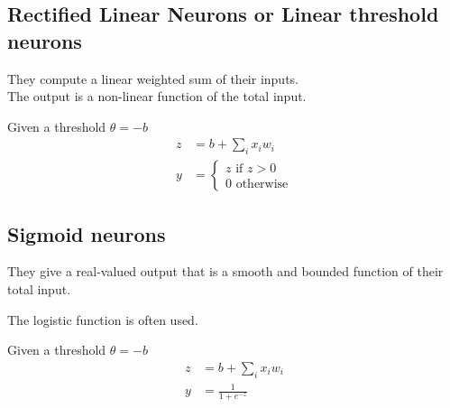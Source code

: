 \documentclass[a4paper]{article}
\begin{document}
\subsection{Rectified Linear Neurons or Linear threshold neurons}

They compute a linear weighted sum of their inputs. \\
The output is a non-linear function of the total input.

Given a threshold \(\theta=-b\)
\begin{align*}    
    z&=b+\sum_{i} x_i w_i \\
    y&=\begin{cases}
        z \text{ if } z > 0 \\
        0 \text{ otherwise}
    \end{cases}
\end{align*}

\begin{center}
\end{center}

\subsection{Sigmoid neurons}

They give a real-valued output that is a smooth and bounded function of their total input.

The logistic function is often used.

Given a threshold \(\theta=-b\)
\begin{align*}    
    z&=b+\sum_{i} x_i w_i \\
    y&=\frac{1}{1+e^{-z}}
\end{align*}

\begin{center}
\end{center}
\end{document}
